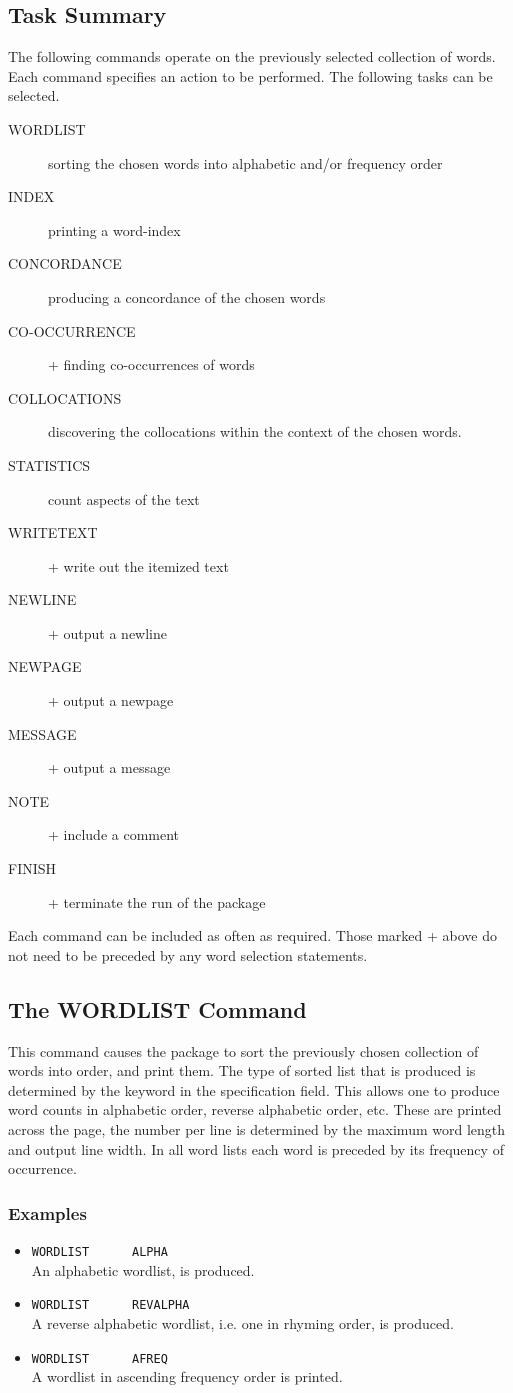 \subsection{Task Summary}
The following commands operate on the previously selected
collection of words.  Each command specifies an action to be
performed. The following tasks can be selected.
\begin{description}
\item[WORDLIST] sorting the chosen words into alphabetic and/or frequency
      order
\item[INDEX] printing a word-index
\item[CONCORDANCE] producing a concordance of the chosen words
\item[CO-OCCURRENCE] + finding co-occurrences of words
\item[COLLOCATIONS] discovering the collocations within the context of the
      chosen words.
\item[STATISTICS] count aspects of the text
\item[WRITETEXT] + write out the itemized text
\item[NEWLINE] + output a newline
\item[NEWPAGE] + output a newpage
\item[MESSAGE] + output a message
\item[NOTE] + include a comment
\item[FINISH] + terminate the run of the package
\end{description}
Each command can be included as often as required. Those marked + above
do not need to be preceded by any word selection statements.

\subsection{The WORDLIST Command}
This command causes the package to sort the previously chosen
collection of words into order, and print them.
The type of sorted list that is produced is determined by the keyword
in the specification field.  This allows one to produce word counts
in alphabetic order, reverse alphabetic order, etc.  These are printed
across the page, the number per line is determined by the maximum
word length and output line width.  In all word lists each word is
preceded by its frequency of occurrence.

\subsubsection{Examples}
\begin{itemize}
\item   \verb/WORDLIST      ALPHA/\\
    An alphabetic wordlist, is produced.
\item   \verb/WORDLIST      REVALPHA/\\
    A reverse alphabetic wordlist, i.e. one in rhyming order, is
    produced.
\item   \verb/WORDLIST      AFREQ/\\
    A wordlist in ascending frequency order is printed.
\end{itemize}

